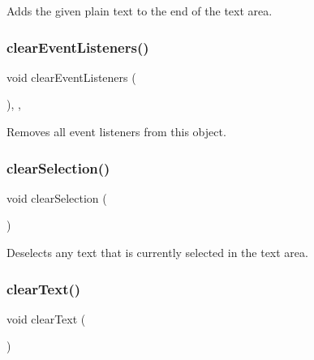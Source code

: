 Adds the given plain text to the end of the text area. 

\mbox{\label{classGObservable_a80cfa040459ff53594adbd6a51ec8f43}} 
\subsubsection{\texorpdfstring{clear\+Event\+Listeners()}{clearEventListeners()}}
{\footnotesize\ttfamily void clear\+Event\+Listeners (\begin{DoxyParamCaption}{ }\end{DoxyParamCaption})\hspace{0.3cm}{\ttfamily [protected]}, {\ttfamily [virtual]}, {\ttfamily [inherited]}}



Removes all event listeners from this object. 

\mbox{\label{classGTextArea_abd07e172ccec6823a88289c21124a367}} 
\subsubsection{\texorpdfstring{clear\+Selection()}{clearSelection()}}
{\footnotesize\ttfamily void clear\+Selection (\begin{DoxyParamCaption}{ }\end{DoxyParamCaption})\hspace{0.3cm}{\ttfamily [virtual]}}



Deselects any text that is currently selected in the text area. 

\mbox{\label{classGTextArea_a25f53c7d92eb2a5197cd4418c0165367}} 
\subsubsection{\texorpdfstring{clear\+Text()}{clearText()}}
{\footnotesize\ttfamily void clear\+Text (\begin{DoxyParamCaption}{ }\end{DoxyParamCaption})\hspace{0.3cm}{\ttfamily [virtual]}}



